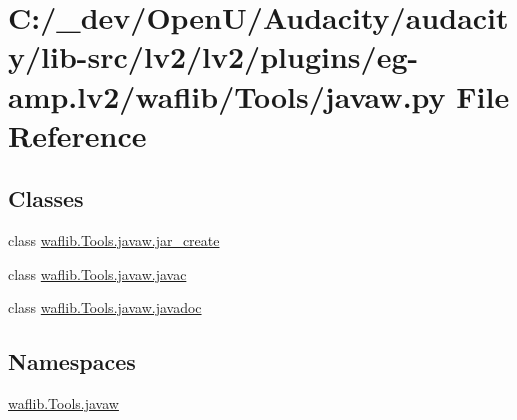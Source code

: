 \hypertarget{lv2_2plugins_2eg-amp_8lv2_2waflib_2_tools_2javaw_8py}{}\section{C\+:/\+\_\+dev/\+Open\+U/\+Audacity/audacity/lib-\/src/lv2/lv2/plugins/eg-\/amp.lv2/waflib/\+Tools/javaw.py File Reference}
\label{lv2_2plugins_2eg-amp_8lv2_2waflib_2_tools_2javaw_8py}
\subsection*{Classes}
\begin{DoxyCompactItemize}
\item 
class \hyperlink{classwaflib_1_1_tools_1_1javaw_1_1jar__create}{waflib.\+Tools.\+javaw.\+jar\+\_\+create}
\item 
class \hyperlink{classwaflib_1_1_tools_1_1javaw_1_1javac}{waflib.\+Tools.\+javaw.\+javac}
\item 
class \hyperlink{classwaflib_1_1_tools_1_1javaw_1_1javadoc}{waflib.\+Tools.\+javaw.\+javadoc}
\end{DoxyCompactItemize}
\subsection*{Namespaces}
\begin{DoxyCompactItemize}
\item 
 \hyperlink{namespacewaflib_1_1_tools_1_1javaw}{waflib.\+Tools.\+javaw}
\end{DoxyCompactItemize}
